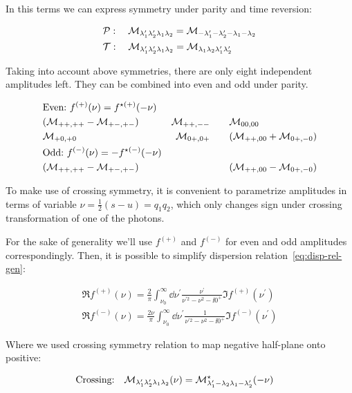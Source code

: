 In this terms we can express symmetry under parity and time reversion:

\begin{align}
    & \mathcal{P}:\quad \mathcal{M}_{\lambda_1^\prime \lambda_2^\prime \lambda_1 \lambda_2} = \mathcal{M}_{-\lambda_1^\prime -\lambda_2^\prime -\lambda_1 -\lambda_2} \\
    & \mathcal{T}:\quad \mathcal{M}_{\lambda_1^\prime \lambda_2^\prime \lambda_1 \lambda_2} = \mathcal{M}_{\lambda_1 \lambda_2 \lambda_1^\prime \lambda_2^\prime}
\end{align}

Taking into account above symmetries, there are only eight independent amplitudes left. They can be combined into even and odd under parity.

\begin{align}
    &\text{Even:}~f^{(+)}(\nu) = f^{\star(+)}(-\nu) && \\ \nonumber
    &(\mathcal{M}_{++,++}-\mathcal{M}_{+-,+-}) &\mathcal{M}_{++,--}\qquad &\mathcal{M}_{00,00}\\
    &\mathcal{M}_{+0,+0} &\mathcal{M}_{0+,0+}\qquad &(\mathcal{M}_{++,00} + \mathcal{M}_{0+,-0})\\
    &\text{Odd:}~f^{(-)}(\nu) = -f^{\star(-)}(-\nu) && \\ \nonumber
    &(\mathcal{M}_{++,++} - \mathcal{M}_{+-,+-}) & &(\mathcal{M}_{++,00} - \mathcal{M}_{0+,-0})
\end{align}

To make use of crossing symmetry, it is convenient to parametrize amplitudes in terms of variable $\nu = \frac{1}{2} (s - u) = q_1 q_2$, which only changes sign under crossing transformation of one of the photons.

For the sake of generality we'll use $f^{(+)}$ and $f^{(-)}$ for even and odd amplitudes correspondingly. Then, it is possible to simplify dispersion relation~\cref{eq:disp-rel-gen}:

\begin{align}
    \Re f^{(+)}(\nu) = \frac{2}{\pi} \int_{\nu_0}^{\infty} \dd{\nu^\prime} \frac{\nu^\prime}{\nu^{\prime 2} - \nu^2 - \ii 0^+} \Im f^{(+)}(\nu^\prime) \\
    \Re f^{(-)}(\nu) = \frac{2\nu}{\pi} \int_{\nu_0}^{\infty} \dd{\nu^\prime} \frac{1}{\nu^{\prime 2} - \nu^2 - \ii 0^+} \Im f^{(-)}(\nu^\prime)
\end{align}

Where we used crossing symmetry relation to map negative half-plane onto positive:

\begin{align}
    & \text{Crossing:}\quad \mathcal{M}_{\lambda_1^\prime \lambda_2^\prime \lambda_1 \lambda_2}(\nu) = \mathcal{M}^\star_{\lambda_1^\prime -\lambda_2 \lambda_1 -\lambda_2^\prime}(-\nu)
\end{align}


